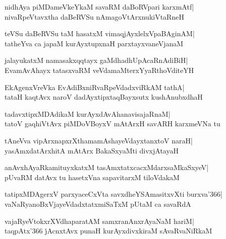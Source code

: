 \documentclass[twoside,12pt,openright]{book}
\newcounter{shloka}[chapter]
\begin{document}
\begin{shloka}%
nidhAya piMDameVkeYkaM savaRM daBoRVpari karxmAtf|\\
nivaRpeVtavxtha daBeRVSu nAmagoVtArxnukiVtaRneH
\end{shloka}

\begin{shloka}%
teVSu daBeRVSu taM hasatxM vimaqjAyxlelxVpaBAginAM|\\
tatheYva ca japaM kurAyxtupxnaH parxtayxvaneVjanaM
\end{shloka}

\begin{shloka}%
jalayukatxM namasakxqqtayx gaMdhadhUpAcaRnAdiBiH|\\
EvamAvAhayx tatasxvaRM veVdamaMterxYyaRthoVditeYH
\end{shloka}

\begin{shloka}%
EkAgenxVreVka EvAdiBxniRvaRpeVdadxviRkAM tathA|\\
tataH kaqtAvx naroV dadAyxtipxtaqBayxsutx kushAnubxdhaH
\end{shloka}

\begin{shloka}%
tadavxtipxMDAdikaM kurAyxdAvAhanavisajaRnaM|\\
tatoV gaqhiVtAvx piMDoVBoyxV mAtArxH savARH karxmeVNa tu
\end{shloka}

\begin{shloka}%
tAneVva vipArxnapxrXthamamAshayeVdayxtanxtoV naraH|\\
yasAmxdatArxhitA mAtArx BakaSxyaMti divxjAtayaH
\end{shloka}

\begin{shloka}%
anAvxhAyaRkamituyxkatxM tasAmxtatxcacxMdarxsaMkaSxyeV|\\
pUvaRM datAvx tu hasetxVna sapavitarxM tiloVdakaM 
\end{shloka}

\begin{shloka}%
tatipxMDAgerxV parxyaceCxVta savxdheYSAmasitxvXti burxva\char'366|\\
vaNaRyanoBxVjayeVdadxtatxmiSaTxM pUtaM ca savaRdA
\end{shloka}

\begin{shloka}%
vajaRyeVtokxrXVdhaparatAM samxranAnxrAyaNaM hariM|\\
taqpAtx\char'366 \. jAcnxtAvx punaH kurAyxdivxkiraM sAvaRvaNiRkaM
\end{shloka}
\end{document}
